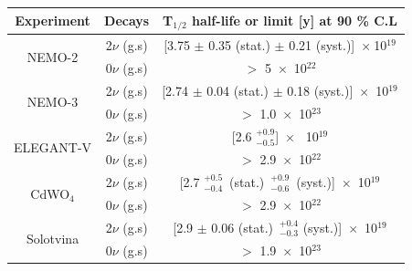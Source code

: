 \documentclass[main.tex]{subfiles}
\begin{document}
\begin{table}[h!]
\begin{center}
\begin{tabular}{c|c|c}
\toprule
Experiment &  Decays & T$_{\text{1}/\text{2}}$ half-life or limit [y] at 90 \% C.L\\[0.1cm]
\midrule[0.05cm]

\multirow{2}{*}{NEMO-2} & 2$\nu$ (g.s) & [3.75 $\pm$ 0.35 (stat.) $\pm$ 0.21 (syst.)]~$\times~$10$^{\text{19}}$\\[0.1cm]
                        & 0$\nu$ (g.s) & $>$ 5~$\times$~10$^{\text{22}}$ \\[0.1cm]
                                               
\midrule   
\multirow{2}{*}{NEMO-3} & 2$\nu$ (g.s) & [2.74 $\pm$ 0.04 (stat.) $\pm$ 0.18 (syst.)]~$\times$~10$^{\text{19}}$\\[0.1cm]
                        & 0$\nu$ (g.s) & $>$ 1.0~$\times$~10$^{\text{23}}$ \\[0.1cm]
                    
\midrule                        

\multirow{2}{*}{ELEGANT-V} & 2$\nu$ (g.s) & [2.6 $^{+\text{0.9}}_{-\text{0.5}}$]~$\times$~ 10$^{\text{19}}$\\[0.1cm]
                           & 0$\nu$ (g.s) & $>$ 2.9~$\times$~10$^{\text{22}}$ \\[0.1cm]
                        
                        
\midrule

\multirow{2}{*}{CdWO$_{4}$} & 2$\nu$ (g.s) & [2.7 $^{+\text{0.5}}_{-\text{0.4}}$~(stat.)~$^{+\text{0.9}}_{-\text{0.6}}$~(syst.)]~$\times$~10$^{\text{19}}$\\[0.1cm]
                           & 0$\nu$ (g.s) & $>$ 2.9~$\times$~10$^{\text{22}}$ \\[0.1cm]

\midrule
                           
                           
\multirow{2}{*}{Solotvina} & 2$\nu$ (g.s) & [2.9 $\pm$ 0.06 (stat.)~$^{+\text{0.4}}_{-\text{0.3}}$ (syst.)]~$\times$~10$^{\text{19}}$\\[0.1cm]
                           & 0$\nu$ (g.s) & $>$ 1.9~$\times$~10$^{\text{23}}$ \\[0.1cm]
                           

\midrule


\end{tabular}
\end{center}
\end{table}
\end{document}
